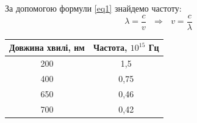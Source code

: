 \documentclass[a4paper,14pt]{extreport}
\begin{document}
	За допомогою формули \ref{eq1} знайдемо частоту:
	\begin{equation}{}
		\lambda = \dfrac{c}{v} \text{ } \Rightarrow \text{ } v = \dfrac{c}{\lambda}
		\label{eq1}
	\end{equation}
	\begin{table}[h]
		\begin{center}
			\begin{tabular}{|c|c|}
			\hline
			Довжина хвилі, нм & Частота, $10^{15}$ Гц \\ \hline
			200               & 1,5                   \\ \hline
			400               & 0,75                  \\ \hline
			650               & 0,46                  \\ \hline
			700               & 0,42                  \\ \hline
			\end{tabular}
		\end{center}
	\end{table}
\end{document}
